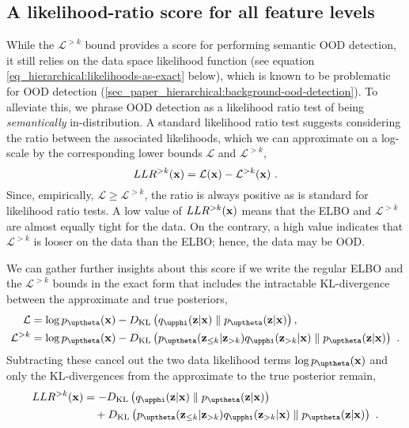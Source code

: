 {\subsection{A likelihood-ratio score for all feature levels}
While the $\mathcal{L}^{>k}$ bound provides a score for performing semantic OOD detection, it still relies on the data space likelihood function (see equation \cref{eq_hierarchical:likelihoods-as-exact} below), which is known to be problematic for OOD detection (\cref{sec_paper_hierarchical:background-ood-detection}). To alleviate this, we phrase OOD detection as a likelihood ratio test of being \emph{semantically} in-distribution.
A standard likelihood ratio test \parencite{buse_likelihood_1982} suggests considering the ratio between the associated likelihoods, which we can approximate on a log-scale by the corresponding lower bounds $\mathcal{L}$ and $\mathcal{L}^{>k}$,
\begin{equation}\label{eq_hierarchical:llr-as-difference-in-likelihoods}
    LLR^{>k}(\xb) = \mathcal{L}(\xb) - \mathcal{L}^{>k}(\xb) \ .
\end{equation}
Since, empirically, $\mathcal{L}\geq\mathcal{L}^{>k}$, the ratio is always positive as is standard for likelihood ratio tests.
A low value of $LLR^{>k}({\mathbf{x}})$ means that the ELBO and $\mathcal{L}^{>k}$ are almost equally tight for the data.
On the contrary, a high value indicates that $\mathcal{L}^{>k}$ is looser on the data than the ELBO; hence, the data may be OOD.


We can gather further insights about this score if we write the regular ELBO and the $\mathcal{L}^{>k}$ bounds in the exact form that includes the intractable KL-divergence between the approximate and true posteriors,
\begin{align}
    \mathcal{L}      &= \log p_\thetab(\xb) - D_{\mathrm{KL}}\left( q_\phib(\zb|\xb) \parallel p_\thetab(\zb|\xb)\right), \label{eq_hierarchical:likelihoods-as-exact} \\ 
    \mathcal{L}^{>k} &= \log p_\thetab(\xb) - D_{\mathrm{KL}}\left( p_\thetab(\zb_{\leq k }|\zb_{>k}) q_\phib(\zb_{>k}|\xb) \parallel p_\thetab(\zb|\xb)\right) \nonumber \ .
\end{align}
Subtracting these cancel out the two data likelihood terms $\log p_\thetab(\xb)$ and only the KL-divergences from the approximate to the true posterior remain,
\begin{align}
    LLR^{>k}(\xb) &= - D_{\mathrm{KL}}\left( q_\phib(\zb|\xb) \parallel p_\thetab(\zb|\xb)\right) \\
                 &\quad + D_{\mathrm{KL}}\left( p_\thetab(\zb_{\leq k}|\zb_{>k}) q_\phib(\zb_{>k}|\xb) \parallel p_\thetab(\zb|\xb)\right) \ . \notag
\end{align}\label{eq_hierarchical:llr-as-kls}

}

